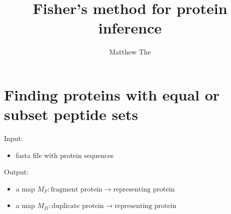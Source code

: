 \documentclass{article}
\title{Fisher's method for protein inference}
\author{Matthew The}
\begin{document}
\maketitle

\section{Finding proteins with equal or subset peptide sets}

Input: 
\begin{itemize}
 \item fasta file with protein sequences
\end{itemize}

Output:
\begin{itemize}
 \item a map $M_F: \mbox{fragment protein} \to \mbox{representing
protein}$
 \item a map $M_D: \mbox{duplicate protein} \to \mbox{representing
protein}$
\end{itemize}
\end{document}
